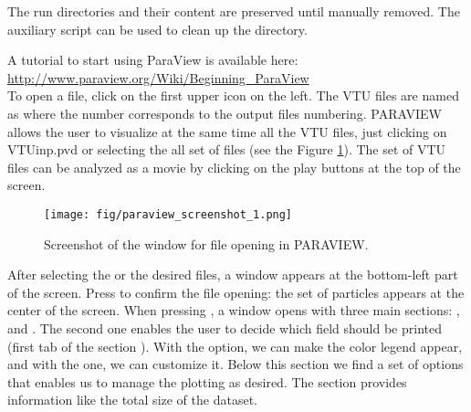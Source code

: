 The run directories and their content are preserved until manually
removed. The  auxiliary script can be used to clean
up the  directory.

A tutorial to start using ParaView is available here:\\
\url{http://www.paraview.org/Wiki/Beginning_ParaView}\\

To open a file, click on the first upper icon on the left. 
The VTU files are named as  where the number corresponds to
the output files numbering. 
PARAVIEW allows the user to visualize at the same time all the VTU files, 
just clicking on VTUinp.pvd or selecting the all set of  files
(see the Figure \ref{fig:paraview_screenshot_1}).
The set of VTU files can be analyzed as a movie by clicking on 
the play buttons at the top of the screen. 

\begin{figure}[h]
  \begin{center}
    \texttt{[image: fig/paraview\_screenshot\_1.png]}
    \caption{Screenshot of the window for file opening in PARAVIEW.}\label{fig:paraview_screenshot_1}   
  \end{center}
\end{figure}
After selecting the  or the desired  files, 
a window appears at the bottom-left part of the screen. 
Press  to confirm the file opening: the set of particles
appears at the center of the screen.
When pressing , a window opens with three main sections: 
,  and . 
The second one enables the user to decide which field should be printed 
(first tab of the section ). 
With the  option, we can make the color legend appear, 
and with the  one, we can customize it. 
Below this section we find a set of options that enables us to manage the plotting as desired.
The  section provides information like the total size of the dataset.\\

